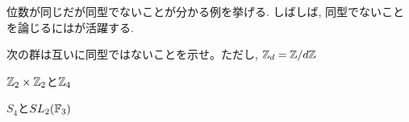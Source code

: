 位数が同じだが同型でないことが分かる例を挙げる. しばしば, 同型でないことを論じるにはが活躍する.

\begin{egprob}
次の群は互いに同型ではないことを示せ。ただし, $\mathbb{Z}_{d} = \mathbb{Z}/d\mathbb{Z}$
\ben
\item $\mathbb{Z}_2\times \mathbb{Z}_2$と$\mathbb{Z}_{4}$
\item $S_4$と$SL_2(\mathbb{F}_{3})$
\een
\end{egprob}
